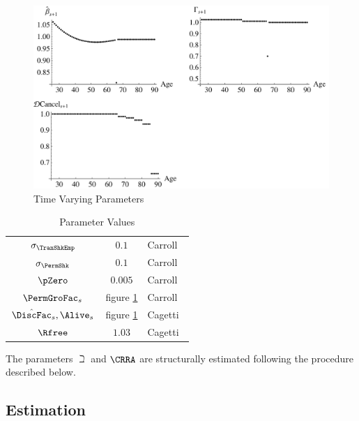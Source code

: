 \documentclass[titlepage, headings=optiontotocandhead]{\econtex}
\begin{document}
\hypertarget{PlotTimeVaryingParam}{}
\begin{figure}[h]
  \includegraphics{./Figures/PlotTimeVaryingParam}
  \caption{Time Varying Parameters}
  \label{fig:TimeVaryingParam}
\end{figure}

\begin{table}[h]
  \caption{Parameter Values}\label{table:StrEstParams}
  \begin{center}
    \begin{tabular}{ccl}
      \hline\hline
      $\sigma _{\TranShkEmp}$    & $0.1$ & Carroll~\citeyearpar{carroll:brookings}
      \\ $\sigma _{\PermShk}$   & $0.1$ & Carroll~\citeyearpar{carroll:brookings}
      \\ $\pZero$           & $0.005$  & Carroll~\citeyearpar{carroll:brookings}
      \\ $\PermGroFac_{s}$        & figure \ref{fig:TimeVaryingParam} & Carroll~\citeyearpar{carrollBSLCPIH}
      \\ $\hat{\DiscFac}_{s},\Alive_{s}$ & figure \ref{fig:TimeVaryingParam} & Cagetti~\citeyearpar{cagettiWprofiles}
      \\$\Rfree$            & $1.03$  & Cagetti~\citeyearpar{cagettiWprofiles}\\
      \hline
    \end{tabular}
  \end{center}
\end{table}

The parameters ${\beth}$ and $\CRRA$ are structurally estimated following the procedure described below.

\subsection{Estimation}
\end{document}
